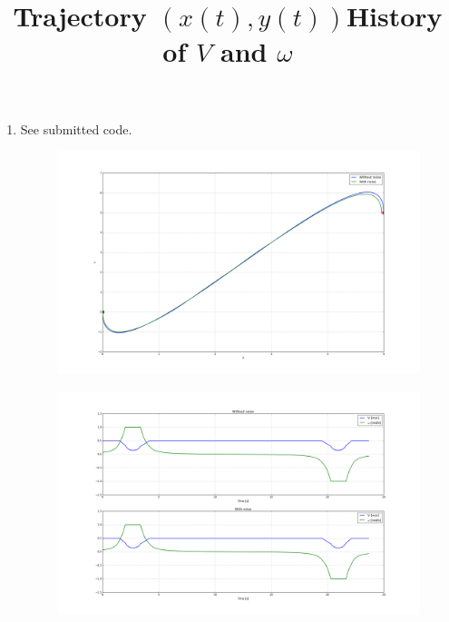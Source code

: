 \documentclass[12pt]{article}
\begin{document}
\begin{enumerate}
\begin{figure}[H]
		\end{figure}
	\item See submitted code.
	\begin{figure}[H]
		\centering
		\title{\bf Trajectory $(x(t), y(t))$}
		\includegraphics[width=\textwidth]{../Figures/hw1_2_v_traj.png}
	\end{figure}
	\begin{figure}[H]
		\centering
		\title{\bf History of $V$ and $\omega$}
		\includegraphics[width=\textwidth]{../Figures/hw1_2_v_control.png}
	\end{figure}
\end{enumerate}
\end{document}
